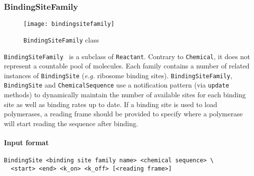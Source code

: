 \subsubsection{BindingSiteFamily}

\begin{figure}[!h]
  \centering
  \texttt{[image: bindingsitefamily]}
  \caption{\texttt{BindingSiteFamily} class}
  \label{fig:bsf}
\end{figure}

\texttt{BindingSiteFamily}~ is a subclass of \texttt{Reactant}. Contrary to \texttt{Chemical}, it does not represent a countable pool of molecules. Each family contains a number of related instances of \texttt{BindingSite} (\textit{e.g.} ribosome binding sites). \texttt{BindingSiteFamily}, \texttt{BindingSite} and \texttt{ChemicalSequence} use a notification pattern (via \texttt{update} methods) to dynamically maintain the number of available sites for each binding site as well as binding rates up to date. If a binding site is used to load polymerases, a reading frame should be provided to specify where a polymerase will start reading the sequence after binding.

\paragraph{Input format}
\begin{verbatim}
BindingSite <binding site family name> <chemical sequence> \
  <start> <end> <k_on> <k_off> [<reading frame>]
\end{verbatim}

